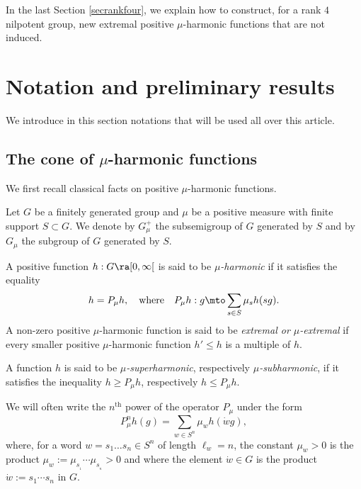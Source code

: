 In the last Section \ref{secrankfour}, we explain how to construct,
for a rank $4$ nilpotent group,
new extremal positive $\mu$-harmonic
functions that are not induced.

\section{Notation and preliminary results}
\label{secnotpre}

We introduce in this section notations
that will be used all over
this article.

\subsection{The cone of $\mu$-harmonic functions}
\label{secconhar}

\bq
We first recall classical facts on positive $\mu$-harmonic functions.
\eq

Let $G$ be a finitely generated group and $\mu$ be a positive
measure with finite support $S\subset G$.
We denote by $G_\mu^+$ the subsemigroup of $G$ generated by $S$
and by $G_\mu$ the subgroup of $G$ generated by $S$.

A positive function $h:G\ra [0,\infty[$ is said to be
\emph{$\mu$-harmonic} if it satisfies the equality
\begin{equation}
\label{eqnfghar}
h= P_{\mu}h,
\quad\text{where}\quad
P_{\mu}h: g\mto \sum_{s\in S}\mu_s h(sg).
\end{equation}
A non-zero positive $\mu$-harmonic function is said to be \emph{extremal
or $\mu$-extremal} if every smaller positive $\mu$-harmonic function
$h'\leq h$ is a multiple of $h$.

A function $h$ is said to be \emph{$\mu$-superharmonic},
respectively \emph{$\mu$-subharmonic},
if it satisfies the inequality $h\geq P_{\mu}h$, respectively $h\leq P_{\mu}h$.

We will often write the $n^\mathrm{th}$ power of the operator $P_\mu$ under the form
\begin{equation}
\label{eqnpmun}
P_{\mu}^nh(g)= \sum_{w\in S^n}\mu_w h(\dot{w}g),
\end{equation}
where, for a word $w=s_1\ldots s_n\in S^n$ of length $\ell_w=n$,
the constant $\mu_w>0$ is the product
$\mu_w:=\mu_{s_{_1}}\cdots \mu_{s_{_n}}>0$
and where the element $\dot{w}\in G$ is the product $\dot{w}:=s_1\cdots s_n$ in $G$.

